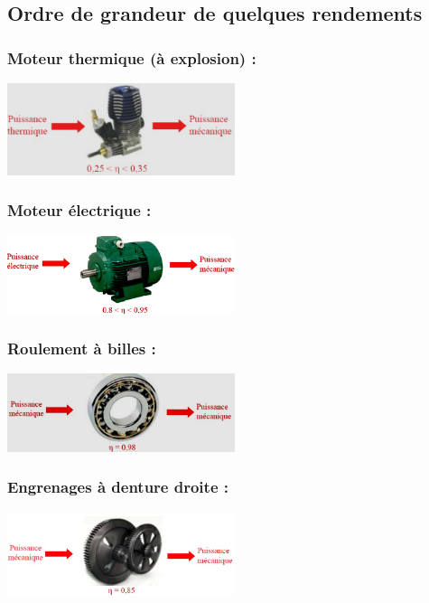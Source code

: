\documentclass[10pt,fleqn]{article} %
\begin{document}
\subsection{Ordre de grandeur de quelques rendements}
\subsubsection{Moteur thermique (à explosion) :}
\begin{center}
    \includegraphics[width=0.5\textwidth]{images/thermique.png}
\end{center}

\subsubsection{Moteur électrique :}
\begin{center}
    \includegraphics[width=0.5\textwidth]{images/eletrique.png}
\end{center}

\subsubsection{Roulement à billes :}
\begin{center}
    \includegraphics[width=0.5\textwidth]{images/roulement.png}
\end{center}

\subsubsection{Engrenages à denture droite :}
\begin{center}
    \includegraphics[width=0.5\textwidth]{images/engrenage.png}
\end{center}
\end{document}
